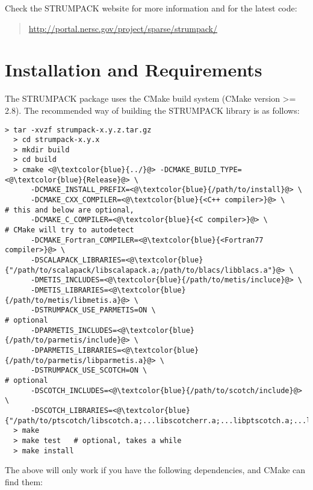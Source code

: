 \documentclass{article}
\begin{document}
\noindent Check the STRUMPACK website for more information and for the
latest code:
\begin{quote}
  \url{http://portal.nersc.gov/project/sparse/strumpack/}
\end{quote}


\section{Installation and Requirements}\label{sec::installation}
The STRUMPACK package uses the CMake build system (CMake version >=
2.8). The recommended way of building the STRUMPACK library is as
follows:
\begin{lstlisting}[style=bash]
  > tar -xvzf strumpack-x.y.z.tar.gz
  > cd strumpack-x.y.x
  > mkdir build
  > cd build
  > cmake <@\textcolor{blue}{../}@> -DCMAKE_BUILD_TYPE=<@\textcolor{blue}{Release}@> \
      -DCMAKE_INSTALL_PREFIX=<@\textcolor{blue}{/path/to/install}@> \
      -DCMAKE_CXX_COMPILER=<@\textcolor{blue}{<C++ compiler>}@> \                           # this and below are optional,
      -DCMAKE_C_COMPILER=<@\textcolor{blue}{<C compiler>}@> \                               # CMake will try to autodetect
      -DCMAKE_Fortran_COMPILER=<@\textcolor{blue}{<Fortran77 compiler>}@> \
      -DSCALAPACK_LIBRARIES=<@\textcolor{blue}{"/path/to/scalapack/libscalapack.a;/path/to/blacs/libblacs.a"}@> \
      -DMETIS_INCLUDES=<@\textcolor{blue}{/path/to/metis/incluce}@> \
      -DMETIS_LIBRARIES=<@\textcolor{blue}{/path/to/metis/libmetis.a}@> \
      -DSTRUMPACK_USE_PARMETIS=ON \                                   # optional
      -DPARMETIS_INCLUDES=<@\textcolor{blue}{/path/to/parmetis/include}@> \
      -DPARMETIS_LIBRARIES=<@\textcolor{blue}{/path/to/parmetis/libparmetis.a}@> \
      -DSTRUMPACK_USE_SCOTCH=ON \                                     # optional
      -DSCOTCH_INCLUDES=<@\textcolor{blue}{/path/to/scotch/include}@> \
      -DSCOTCH_LIBRARIES=<@\textcolor{blue}{"/path/to/ptscotch/libscotch.a;...libscotcherr.a;...libptscotch.a;...libptscotcherr.a"}@>
  > make
  > make test   # optional, takes a while
  > make install
\end{lstlisting}
The above will only work if you have the following dependencies, and
CMake can find them:
\end{document}
